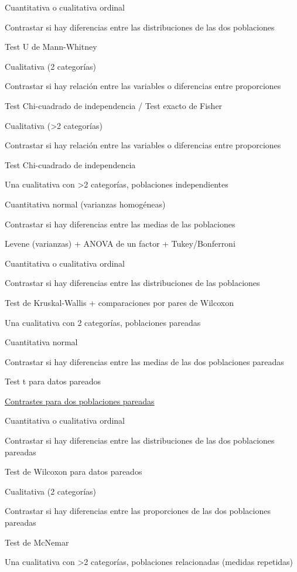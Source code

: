 \documentclass[
  spanish,
  a4paper,
]{scrreport}
\theoremstyle{definition}
\theoremstyle{definition}
\theoremstyle{remark}
\begin{document}
Cuantitativa o cualitativa ordinal

Contrastar si hay diferencias entre las distribuciones de las dos
poblaciones

Test U de Mann-Whitney

Cualitativa (2 categorías)

Contrastar si hay relación entre las variables o diferencias entre
proporciones

Test Chi-cuadrado de independencia / Test exacto de Fisher

Cualitativa (\textgreater2 categorías)

Contrastar si hay relación entre las variables o diferencias entre
proporciones

Test Chi-cuadrado de independencia

Una cualitativa con \textgreater2 categorías, poblaciones independientes

Cuantitativa normal (varianzas homogéneas)

Contrastar si hay diferencias entre las medias de las poblaciones

Levene (varianzas) + ANOVA de un factor + Tukey/Bonferroni

Cuantitativa o cualitativa ordinal

Contrastar si hay diferencias entre las distribuciones de las
poblaciones

Test de Kruskal-Wallis + comparaciones por pares de Wilcoxon

Una cualitativa con 2 categorías, poblaciones pareadas

Cuantitativa normal

Contrastar si hay diferencias entre las medias de las dos poblaciones
pareadas

Test t para datos pareados

\href{13-contrastes-dos-poblaciones-pareadas.qmd}{Contrastes para dos
poblaciones pareadas}

Cuantitativa o cualitativa ordinal

Contrastar si hay diferencias entre las distribuciones de las dos
poblaciones pareadas

Test de Wilcoxon para datos pareados

Cualitativa (2 categorías)

Contrastar si hay diferencias entre las proporciones de las dos
poblaciones pareadas

Test de McNemar

Una cualitativa con \textgreater2 categorías, poblaciones relacionadas
(medidas repetidas)
\end{document}
